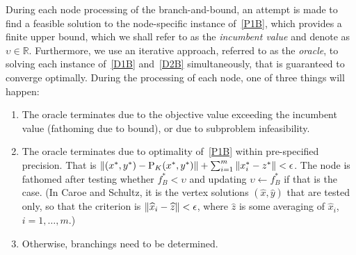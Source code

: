 During each node processing of the branch-and-bound, an attempt is made to find a feasible solution to the node-specific instance of~\eqref{P1B}, which provides a finite upper bound, which we shall refer to as the \emph{incumbent value} and denote as $\upsilon \in \mathbb{R}$. Furthermore, we use an iterative approach, referred to as the \emph{oracle}, to solving each instance of~\eqref{D1B} and~\eqref{D2B} simultaneously, that is guaranteed to converge optimally. During the processing of each node, one of three things will happen:
\begin{enumerate}
\item The oracle terminates due to the objective value exceeding the incumbent value (fathoming due to bound), or due to subproblem infeasibility.
\item The oracle terminates due to optimality of~\eqref{P1B} within pre-specified precision. 
That is $\left \| (x^*,y^*) - \text{P}_K(x^*,y^*) \right \| + \sum_{i=1}^m \left \| x_i^* - z^* \right \| < \epsilon$. The node is fathomed after testing whether $f_B^* < \upsilon$
and updating $\upsilon \gets f_B^*$ if that is the case. (In Caroe and Schultz, it is the vertex solutions $(\widehat{x},\widehat{y})$ that are tested only, so that the criterion is $\left \| \widehat{x}_i - \widehat{z} \right \| < \epsilon$, where $\widehat{z}$ is some averaging of $\widehat{x}_i$, $i=1,\dots,m$.)
\item Otherwise, branchings need to be determined.
\end{enumerate}

